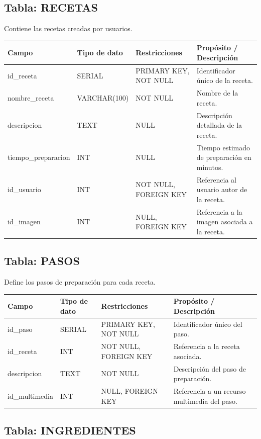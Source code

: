 \documentclass[12pt,a4paper]{article}
\begin{document}
\subsection{Tabla: RECETAS}

Contiene las recetas creadas por usuarios.

\begin{longtable}{|p{3.5cm}|p{2.5cm}|p{3.5cm}|p{5cm}|}
\hline
\textbf{Campo} & \textbf{Tipo de dato} & \textbf{Restricciones} & \textbf{Propósito / Descripción} \\
\hline
id\_receta & SERIAL & PRIMARY KEY, NOT NULL & Identificador único de la receta. \\
\hline
nombre\_receta & VARCHAR(100) & NOT NULL & Nombre de la receta. \\
\hline
descripcion & TEXT & NULL & Descripción detallada de la receta. \\
\hline
tiempo\_preparacion & INT & NULL & Tiempo estimado de preparación en minutos. \\
\hline
id\_usuario & INT & NOT NULL, FOREIGN KEY & Referencia al usuario autor de la receta. \\
\hline
id\_imagen & INT & NULL, FOREIGN KEY & Referencia a la imagen asociada a la receta. \\
\hline
\end{longtable}

\subsection{Tabla: PASOS}

Define los pasos de preparación para cada receta.

\begin{longtable}{|p{3.5cm}|p{2.5cm}|p{3.5cm}|p{5cm}|}
\hline
\textbf{Campo} & \textbf{Tipo de dato} & \textbf{Restricciones} & \textbf{Propósito / Descripción} \\
\hline
id\_paso & SERIAL & PRIMARY KEY, NOT NULL & Identificador único del paso. \\
\hline
id\_receta & INT & NOT NULL, FOREIGN KEY & Referencia a la receta asociada. \\
\hline
descripcion & TEXT & NOT NULL & Descripción del paso de preparación. \\
\hline
id\_multimedia & INT & NULL, FOREIGN KEY & Referencia a un recurso multimedia del paso. \\
\hline
\end{longtable}

\subsection{Tabla: INGREDIENTES}
\end{document}
